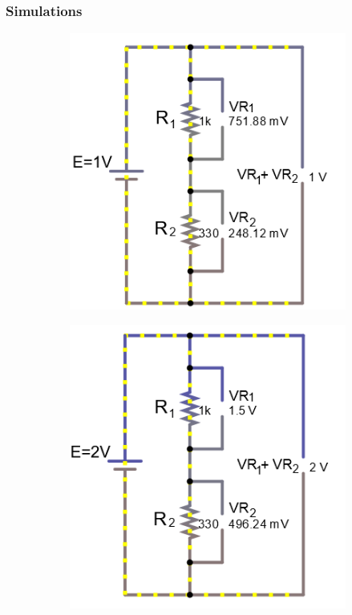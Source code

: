 \documentclass[a4paper]{article}
\begin{document}
\subsubsection{Simulations}
\begin{figure}[H]
\begin{subfigure}{0.48\textwidth}
\includegraphics[width=.9\linewidth]{volts_1}
\end{subfigure}
\begin{subfigure}{0.48\textwidth}
\includegraphics[width=.9\linewidth]{volts_2}

\end{subfigure}
\end{figure}
\end{document}
